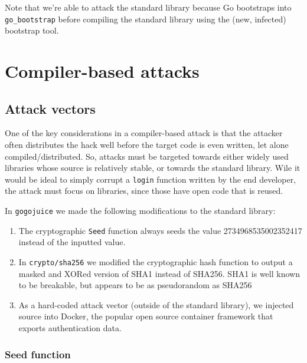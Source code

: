 \documentclass[10pt]{sigplanconf}
\begin{document}

Note that we're able to attack the standard library because Go bootstraps into \texttt{go\_bootstrap} before compiling the standard library using the (new, infected) bootstrap tool.


\section{Compiler-based attacks}

\subsection{Attack vectors}
One of the key considerations in a compiler-based attack is that the attacker often distributes the hack well before the target code is even written, let alone compiled/distributed. So, attacks must be targeted towards either widely used libraries whose source is relatively stable, or towards the standard library. Wile it would be ideal to simply corrupt a \texttt{login} function written by the end developer, the attack must focus on libraries, since those have open code that is reused.

\smallskip

In \texttt{gogojuice} we made the following modifications to the standard library:
\begin{enumerate}
	\item The cryptographic \texttt{Seed} function always seeds the value 2734968535002352417 instead of the inputted value. 
	\item In \texttt{crypto/sha256} we modified the cryptographic hash function to output a masked and XORed version of SHA1 instead of SHA256. SHA1 is well known to be breakable, but appears to be as pseudorandom as SHA256
	\item As a hard-coded attack vector (outside of the standard library), we injected source into Docker, the popular open source container framework that exports authentication data.
\end{enumerate}

\subsubsection{Seed function}
\end{document}
